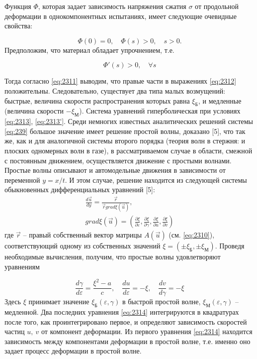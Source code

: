 \documentclass[specialist, subf, href, colorlinks=true, 14pt, final]{disser}
\theoremstyle{definition}
\begin{document}
Функция $\Phi$, которая задает зависимость напряжения сжатия $\sigma$ от продольной деформации в однокомпонентных испытаниях, имеет следующие очевидные свойства:
\addtocounter{equation}{1}
\begin{equation}\label{eq:2313}
	 \Phi(0) = 0,\quad \Phi(s) > 0,\quad s > 0 .
	\tag{13}
\end{equation} 
Предположим, что материал обладает упрочнением, т.е.
\addtocounter{equation}{1}
\begin{equation}\label{eq:2313'}
	 \Phi'(s) > 0,\quad \forall s
	\tag{13$'$}
\end{equation} 

Тогда согласно \eqref{eq:2311} выводим, что правые части в выражениях \eqref{eq:2312} положительны. Следовательно, существует два типа малых  возмущений: быстрые, величина скорости распространения которых равна $\xi_{\text{Б}}$, и медленные (величина скорости $-\xi_{\text{М}}$). Система уравнений гиперболическая при условиях \eqref{eq:2313}, \eqref{eq:2313'}. Среди немногих известных аналитических решений системы \eqref{eq:239} большое значение имеет решение простой волны, доказано [5], что так же, как и для аналогичной системы второго порядка (теория волн в стержня: и плоских одномерных волн в газе), в  рассматриваемом случае в области, смежной с постоянным движением, осуществляется движение с простыми волнами. Простые волны описывают и автомодельные движения в зависимости от переменной $y=x/t$. И этом случае, решение находится из следующей системы обыкновенных дифференциальных уравнений [5]:
\[
	\begin{array}{l}
	\displaystyle \frac{d\overrightarrow{u} }{dy} = \displaystyle \frac{\overrightarrow{r}}{\overrightarrow{r} grad \xi(\overrightarrow{u})},\\
	grad \xi(\overrightarrow{u}) = \left( \displaystyle \frac{\partial \xi}{\partial \varepsilon} , \frac{\partial \xi}{\partial \gamma} , \frac{\partial \xi}{\partial u} , \frac{\partial \xi}{\partial v} \right)
	\end{array}
\]
где $\overrightarrow{r}$ -- правый собственный вектор матрицы $A(\overrightarrow{u})$ (см. \eqref{eq:2310}), соответствующий одному из собственных значений $\xi = (\pm \xi_{\text{Б}}, \pm \xi_{\text{М}})$. Проведя необходимые вычисления, получим, что простые волны удовлетворяют уравнениям
\addtocounter{equation}{1}
\begin{equation}\label{eq:2314}
	 \frac{d\gamma}{d\varepsilon} = \frac{\xi^2 - a}{c}, \quad \frac{d u}{d \varepsilon} = - \xi, \quad \frac{d v}{d \gamma} = - \xi
	\tag{14}
\end{equation}
Здесь $\xi$ принимает значение $\xi_{\text{Б}}(\varepsilon, \gamma)$ в быстрой простой волне, $\xi_{\text{М}}(\varepsilon, \gamma)$ -- медленной. Два последних уравнения \eqref{eq:2314} интегрируются в квадратурах после того, как проинтегрировано первое, и определяют зависимость скоростей частиц $u,\ v$ от компонент деформации. Из первого уравнения \eqref{eq:2314} находится зависимость между компонентами деформации в простой волне, т.е. именно оно задает процесс деформации в простой волне.
\end{document}
